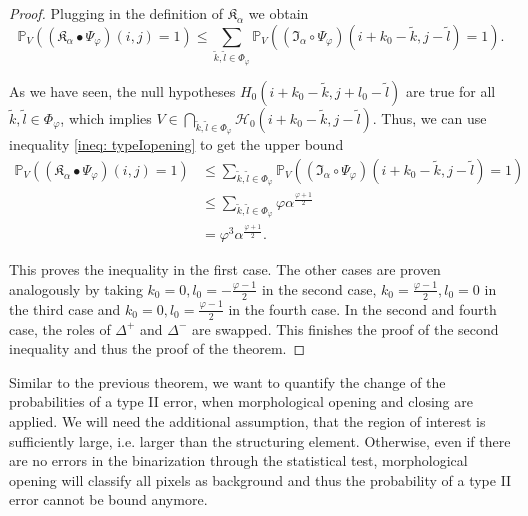 \documentclass[a4paper,12pt]{article}
\theoremstyle{plain}
\theoremstyle{definition}
\begin{document}
\begin{proof}
	Plugging in the definition of $\mathfrak{K}_\alpha$ we obtain
	\begin{equation*}
		\mathbb{P}_V\left( (\mathfrak{K}_\alpha \bullet \Psi_\varphi)(i, j) = 1 \right) \leq \sum_{\tilde{k}, \tilde{l} \in \Phi_\varphi} \mathbb{P}_V\left( (\mathfrak{I}_\alpha \circ \Psi_\varphi)(i + k_0 - \tilde{k}, j - \tilde{l}) = 1 \right).
	\end{equation*}
	
	As we have seen, the null hypotheses $H_0(i + k_0 - \tilde{k}, j + l_0 - \tilde{l})$ are true for all $\tilde{k}, \tilde{l} \in \Phi_\varphi$, which implies $V \in \bigcap_{\tilde{k}, \tilde{l} \in \Phi_\varphi} \mathcal{H}_0(i + k_0 - \tilde{k}, j - \tilde{l})$. Thus, we can use inequality \eqref{ineq: typeIopening} to get the upper bound
	\begin{align*}
		\mathbb{P}_V\left( (\mathfrak{K}_\alpha \bullet \Psi_\varphi)(i, j) = 1 \right) &\leq \sum_{\tilde{k}, \tilde{l} \in \Phi_\varphi} \mathbb{P}_V\left( (\mathfrak{I}_\alpha \circ \Psi_\varphi)(i + k_0 - \tilde{k}, j - \tilde{l}) = 1 \right) \\
		&\leq \sum_{\tilde{k}, \tilde{l} \in \Phi_\varphi} \varphi \alpha^{\frac{\varphi + 1}{2}} \\
		&= \varphi^3 \alpha^{\frac{\varphi + 1}{2}}.
	\end{align*}
	
	This proves the inequality in the first case. The other cases are proven analogously by taking $k_0 = 0, l_0 = -\frac{\varphi - 1}{2}$ in the second case, $k_0 = \frac{\varphi - 1}{2}, l_0 = 0$ in the third case and $k_0 = 0, l_0 = \frac{\varphi - 1}{2}$ in the fourth case. In the second and fourth case, the roles of $\Delta^+$ and $\Delta^-$ are swapped. This finishes the proof of the second inequality and thus the proof of the theorem.
\end{proof}

Similar to the previous theorem, we want to quantify the change of the probabilities of a type II error, when morphological opening and closing are applied. We will need the additional assumption, that the region of interest is sufficiently large, i.e. larger than the structuring element. Otherwise, even if there are no errors in the binarization through the statistical test, morphological opening will classify all pixels as background and thus the probability of a type II error cannot be bound anymore.
\end{document}
